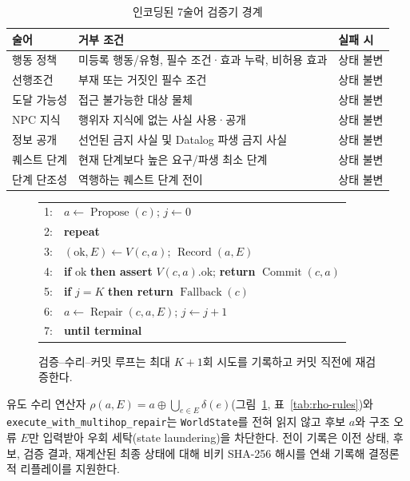 \begin{table}[!tbp]
\caption{인코딩된 7술어 검증기 경계}
\label{tab:validators}
\centering
\footnotesize
\begin{tabularx}{\columnwidth}{@{}>{\raggedright\arraybackslash}p{}>{\raggedright\arraybackslash}X>{\raggedright\arraybackslash}p{}@{}}
\toprule
\textbf{술어} & \textbf{거부 조건} & \textbf{실패 시} \\
\midrule
행동 정책 & 미등록 행동/유형, 필수 조건·효과 누락, 비허용 효과 & 상태 불변 \\
선행조건 & 부재 또는 거짓인 필수 조건 & 상태 불변 \\
도달 가능성 & 접근 불가능한 대상 물체 & 상태 불변 \\
NPC 지식 & 행위자 지식에 없는 사실 사용·공개 & 상태 불변 \\
정보 공개 & 선언된 금지 사실 및 Datalog 파생 금지 사실 & 상태 불변 \\
퀘스트 단계 & 현재 단계보다 높은 요구/파생 최소 단계 & 상태 불변 \\
단계 단조성 & 역행하는 퀘스트 단계 전이 & 상태 불변 \\
\bottomrule
\end{tabularx}
\end{table}

\begin{figure}[!tbp]
\centering
\footnotesize
\begin{tabular}{@{}rl@{}}
1: & $a\leftarrow\operatorname{Propose}(c)$; $j\leftarrow0$ \\
2: & \textbf{repeat} \\
3: & \quad $(\mathrm{ok},E)\leftarrow V(c,a)$; $\operatorname{Record}(a,E)$ \\
4: & \quad \textbf{if} $\mathrm{ok}$ \textbf{then assert} $V(c,a).\mathrm{ok}$; \textbf{return} $\operatorname{Commit}(c,a)$ \\
5: & \quad \textbf{if} $j=K$ \textbf{then return} $\operatorname{Fallback}(c)$ \\
6: & \quad $a\leftarrow\operatorname{Repair}(c,a,E)$; $j\leftarrow j+1$ \\
7: & \textbf{until terminal}
\end{tabular}
\caption{검증--수리--커밋 루프는 최대 $K+1$회 시도를 기록하고 커밋 직전에 재검증한다.}
\label{alg:commit}
\end{figure}

유도 수리 연산자 $\rho(a,E)=a\oplus\bigcup_{e\in E}\delta(e)$(그림~\ref{alg:commit}, 표~\ref{tab:rho-rules})와 \texttt{execute\_\allowbreak with\_\allowbreak multihop\_\allowbreak repair}는 \texttt{WorldState}를 전혀 읽지 않고 후보 $a$와 구조 오류 $E$만 입력받아 우회 세탁(state laundering)을 차단한다. 전이 기록은 이전 상태, 후보, 검증 결과, 재계산된 최종 상태에 대해 비키 SHA-256 해시를 연쇄 기록해 결정론적 리플레이를 지원한다.

